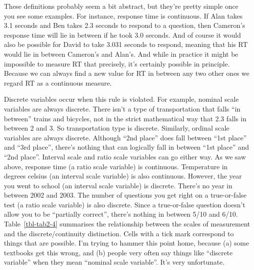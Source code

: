 \documentclass[
  a4paper,
]{book}
\begin{document}
\begin{table}

\caption{\label{tbl-tab2-4}The relationship between the scales of
measurement and the discrete/continuity distinction. Cells with a tick
mark correspond to things that are possible}

\centering
{}

\end{table}%

These definitions probably seem a bit abstract, but they're pretty
simple once you see some examples. For instance, response time is
continuous. If Alan takes 3.1 seconds and Ben takes 2.3 seconds to
respond to a question, then Cameron's response time will lie in between
if he took 3.0 seconds. And of course it would also be possible for
David to take 3.031 seconds to respond, meaning that his RT would lie in
between Cameron's and Alan's. And while in practice it might be
impossible to measure RT that precisely, it's certainly possible in
principle. Because we can always find a new value for RT in between any
two other ones we regard RT as a continuous measure.

Discrete variables occur when this rule is violated. For example,
nominal scale variables are always discrete. There isn't a type of
transportation that falls ``in between'' trains and bicycles, not in the
strict mathematical way that 2.3 falls in between 2 and 3. So
transportation type is discrete. Similarly, ordinal scale variables are
always discrete. Although ``2nd place'' does fall between ``1st place''
and ``3rd place'', there's nothing that can logically fall in between
``1st place'' and ``2nd place''. Interval scale and ratio scale
variables can go either way. As we saw above, response time (a ratio
scale variable) is continuous. Temperature in degrees celsius (an
interval scale variable) is also continuous. However, the year you went
to school (an interval scale variable) is discrete. There's no year in
between 2002 and 2003. The number of questions you get right on a
true-or-false test (a ratio scale variable) is also discrete. Since a
true-or-false question doesn't allow you to be ``partially correct'',
there's nothing in between 5/10 and 6/10. Table~\ref{tbl-tab2-4}
summarises the relationship between the scales of measurement and the
discrete/continuity distinction. Cells with a tick mark correspond to
things that are possible. I'm trying to hammer this point home, because
(a) some textbooks get this wrong, and (b) people very often say things
like ``discrete variable'' when they mean ``nominal scale variable''.
It's very unfortunate.
\end{document}
